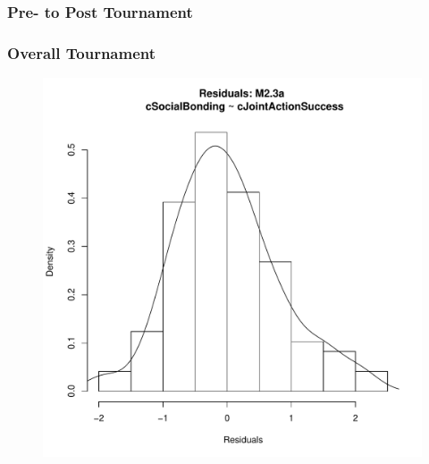 {      \subsubsection{Pre- to Post Tournament\label{app8:MLM23a}}
          


      \subsubsection{Overall Tournament}

      \begin{figure}[htbp]
        \includegraphics[scale =.4]{images/MLM23aHist.pdf}

\end{figure}}
